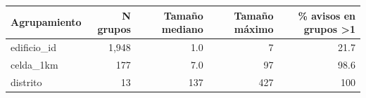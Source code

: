 \begin{tabular}{lrrrr}
\toprule
Agrupamiento & N grupos & Tamaño mediano & Tamaño máximo & \% avisos en grupos >1 \\
\midrule
edificio\_id & 1,948 & 1.0 & 7 & 21.7 \\
celda\_1km & 177 & 7.0 & 97 & 98.6 \\
distrito & 13 & 137 & 427 & 100 \\
\bottomrule
\end{tabular}